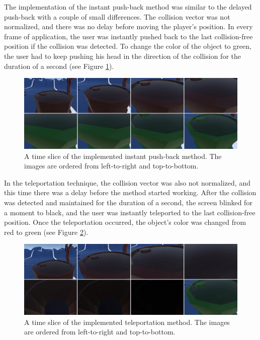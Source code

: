 The implementation of the instant push-back method was similar to the delayed push-back with a couple of small differences. The collision vector was not normalized, and there was no delay before moving the player's position. In every frame of application, the user was instantly pushed back to the last collision-free position if the collision was detected. To change the color of the object to green, the user had to keep pushing his head in the direction of the collision for the duration of a second (see Figure \ref{fig:instantimplementation}). 

\begin{figure}[th]
\centering
\includegraphics[width=1\textwidth]{img/instant_implementation.jpg}
\caption{A time slice of the implemented instant push-back method. The images are ordered from left-to-right and top-to-bottom.}
\label{fig:instantimplementation}
\end{figure}

In the teleportation technique, the collision vector was also not normalized, and this time there was a delay before the method started working. After the collision was detected and maintained for the duration of a second, the screen blinked for a moment to black, and the user was instantly teleported to the last collision-free position. Once the teleportation occurred, the object's color was changed from red to green (see Figure \ref{fig:teleportimplementation}).

\begin{figure}[th]
\centering
\includegraphics[width=1\textwidth]{img/teleport_implementation.jpg}
\caption{A time slice of the implemented teleportation method. The images are ordered from left-to-right and top-to-bottom.}
\label{fig:teleportimplementation}
\end{figure}

